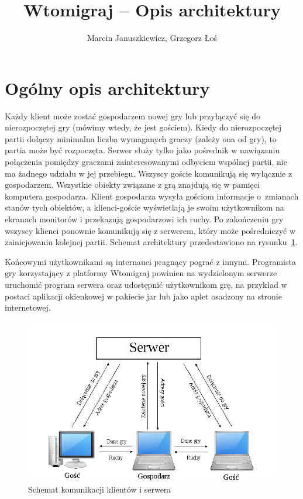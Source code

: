 \documentclass[a4paper, 12pt]{article}
\author{Marcin Januszkiewicz, Grzegorz Łoś}
\title{\textbf{Wtomigraj} -- Opis architektury}
\begin{document}


\setcounter{page}{2}

\tableofcontents

\break

\section{Ogólny opis architektury}

Każdy klient może zostać gospodarzem nowej gry lub przyłączyć się do nierozpoczętej gry (mówimy wtedy, że jest gościem). Kiedy do nierozpoczętej partii dołączy minimalna liczba wymaganych graczy (zależy ona od gry), to partia może być rozpoczęta. Serwer służy tylko jako pośrednik w nawiązaniu połączenia pomiędzy graczami zainteresowanymi odbyciem wspólnej partii, nie ma żadnego udziału w jej przebiegu. Wszyscy goście komunikują się wyłącznie z gospodarzem. Wszystkie obiekty związane z grą znajdują się w pamięci komputera gospodarza. Klient gospodarza wysyła gościom informacje o~zmianach stanów tych obiektów, a klienci-goście wyświetlają je swoim użytkownikom na ekranach monitorów i przekazują gospodarzowi ich ruchy. Po zakończeniu gry wszyscy klienci ponownie komunikują się z serwerem, który może pośredniczyć w zainicjowaniu kolejnej partii. Schemat architektury przedestawiono na rysunku~\ref{fig:arch}.

Końcowymi użytkownikami są internauci pragnący pograć z innymi. Programista gry korzystający z platformy Wtomigraj powinien na wydzielonym serwerze uruchomić program serwera oraz udostępnić użytkownikom grę, na przykład w postaci aplikacji okienkowej w pakiecie jar lub jako aplet osadzony na stronie internetowej.

\begin{figure}
\centering
\includegraphics[scale=0.6]{rysunki/arch.png}
\caption{Schemat komunikacji klientów i serwera}
\label{fig:arch}
\end{figure}
\end{document}
